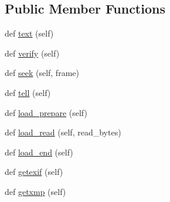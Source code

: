 \subsection*{Public Member Functions}
\begin{DoxyCompactItemize}
\item 
def \hyperlink{classPIL_1_1PngImagePlugin_1_1PngImageFile_a295c8cab8c6dcdb9f7f7c9ee11432b3e}{text} (self)
\item 
def \hyperlink{classPIL_1_1PngImagePlugin_1_1PngImageFile_aa3affdc119a0dc06e7168c105e13ec7a}{verify} (self)
\item 
def \hyperlink{classPIL_1_1PngImagePlugin_1_1PngImageFile_a2f6d9e747d4f1f05565f0c428683ef7d}{seek} (self, frame)
\item 
def \hyperlink{classPIL_1_1PngImagePlugin_1_1PngImageFile_abda5373a24cd719ee34f567a4844458c}{tell} (self)
\item 
def \hyperlink{classPIL_1_1PngImagePlugin_1_1PngImageFile_ae88a25a4a2d6ed7fbfc2e5cdd1fedc82}{load\+\_\+prepare} (self)
\item 
def \hyperlink{classPIL_1_1PngImagePlugin_1_1PngImageFile_a2d4ebf7b716716fe97ba870390f355f9}{load\+\_\+read} (self, read\+\_\+bytes)
\item 
def \hyperlink{classPIL_1_1PngImagePlugin_1_1PngImageFile_a9fa4632ac005afe109a361ccbee5d6ba}{load\+\_\+end} (self)
\item 
def \hyperlink{classPIL_1_1PngImagePlugin_1_1PngImageFile_aef2fc57f89244c6698108a2ed31e1cd3}{getexif} (self)
\item 
def \hyperlink{classPIL_1_1PngImagePlugin_1_1PngImageFile_ad726ff511a5aacbe199437ffa6bc5278}{getxmp} (self)
\end{DoxyCompactItemize}
